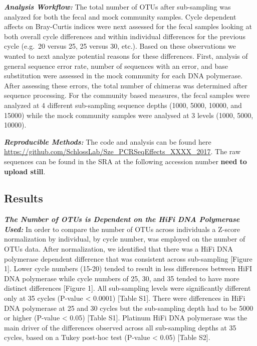 \documentclass[12pt,]{article}
\begin{document}
\textbf{\emph{Analysis Workflow:}} The total number of OTUs after
sub-sampling was analyzed for both the fecal and mock community samples.
Cycle dependent affects on Bray-Curtis indices were next assessed for
the fecal samples looking at both overall cycle differences and within
individual differences for the previous cycle (e.g.~20 versus 25, 25
versus 30, etc.). Based on these observations we wanted to next analyze
potential reasons for these differences. First, analysis of general
sequence error rate, number of sequences with an error, and base
substitution were assessed in the mock community for each DNA
polymerase. After assessing these errors, the total number of chimeras
was determined after sequence processing. For the community based
measures, the fecal samples were analyzed at 4 different sub-sampling
sequence depths (1000, 5000, 10000, and 15000) while the mock community
samples were analysed at 3 levels (1000, 5000, 10000).

\textbf{\emph{Reproducible Methods:}} The code and analysis can be found
here \url{https://github.com/SchlossLab/Sze_PCRSeqEffects_XXXX_2017}.
The raw sequences can be found in the SRA at the following accession
number \textbf{need to upload still}.

\newpage

\subsection{Results}\label{results}

\textbf{\emph{The Number of OTUs is Dependent on the HiFi DNA Polymerase
Used:}} In order to compare the number of OTUs across individuals a
Z-score normalization by individual, by cycle number, was employed on
the number of OTUs data. After normalization, we identified that there
was a HiFi DNA polymerase dependent difference that was consistent
across sub-sampling {[}Figure 1{]}. Lower cycle numbers (15-20) tended
to result in less differences between HiFI DNA polymerase while cycle
numbers of 25, 30, and 35 tended to have more distinct differences
{[}Figure 1{]}. All sub-sampling levels were significantly different
only at 35 cycles (P-value \textless{} 0.0001) {[}Table S1{]}. There
were differences in HiFi DNA polymerase at 25 and 30 cycles but the
sub-sampling depth had to be 5000 or higher (P-value \textless{} 0.05)
{[}Table S1{]}. Platinum HiFi DNA polymerase was the main driver of the
differences observed across all sub-sampling depths at 35 cycles, based
on a Tukey post-hoc test (P-value \textless{} 0.05) {[}Table S2{]}.
\end{document}
